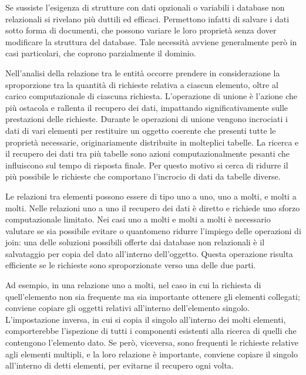 Se sussiste l’esigenza di strutture con dati opzionali o variabili i database non relazionali si rivelano più duttili ed efficaci. Permettono infatti di salvare i dati sotto forma di documenti, che possono variare le loro proprietà senza dover modificare la struttura del database. Tale necessità avviene generalmente però in casi particolari, che coprono parzialmente il dominio. 



Nell’analisi della relazione tra le entità occorre prendere in considerazione la sproporzione tra la quantità di richieste relativa a ciascun elemento, oltre al carico computazionale di ciascuna richiesta. 
L’operazione di unione è l’azione che più ostacola e rallenta il recupero dei dati, impattando significativamente sulle prestazioni delle richieste.
Durante le operazioni di unione vengono incrociati i dati di vari elementi per restituire un oggetto coerente che presenti tutte le proprietà necessarie, originariamente distribuite in molteplici tabelle. La ricerca e il recupero dei dati tra più tabelle sono azioni computazionalmente pesanti che influiscono sul tempo di risposta finale. Per questo motivo si cerca di ridurre il più possibile le richieste che comportano l’incrocio di dati da tabelle diverse. 

Le relazioni tra elementi possono essere di tipo uno a uno, uno a molti, e molti a molti. Nelle relazioni uno a uno il recupero dei dati è diretto e richiede uno sforzo computazionale limitato. Nei casi uno a molti e molti a molti è necessario valutare se sia possibile evitare o quantomeno ridurre l’impiego delle operazioni di join: una delle soluzioni possibili offerte dai database non relazionali è il salvataggio per copia del dato all’interno dell’oggetto. Questa operazione risulta efficiente se le richieste sono sproporzionate verso una delle due parti.

Ad esempio, in una relazione uno a molti, nel caso in cui la richiesta di quell’elemento non sia frequente ma sia importante ottenere gli elementi collegati; conviene copiare gli oggetti relativi all’interno dell’elemento singolo. L’impostazione inversa, in cui si copia il singolo all’interno dei molti elementi, comporterebbe l’ispezione di tutti i componenti esistenti alla ricerca di quelli che contengono l’elemento dato. 
Se però, viceversa, sono frequenti le richieste relative agli elementi multipli, e la loro relazione è importante, conviene copiare il singolo all'interno di detti elementi, per evitarne il recupero ogni volta.

